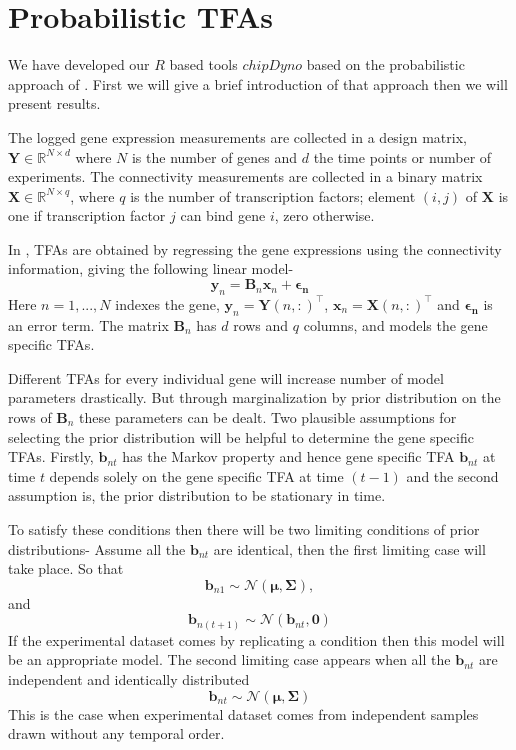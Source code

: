 \section{Probabilistic TFAs}
We have developed our $R$ based tools $chipDyno$ based on the probabilistic approach of \cite{Sanguinetti:2006}. First we will give a brief introduction of that approach then we will present results.

The logged gene expression measurements are collected in a design matrix, $\textbf{Y} \in \mathbb{R}^{ N \times d}$ where $N$ is the number of genes and $d$ the time points or number of experiments. 
The connectivity measurements are collected in a binary matrix $\textbf{X} \in \mathbb{R} ^ {N \times q}$, where $q$ is the number of transcription factors; element $(i, j)$ of $\textbf{X}$ is one 
if transcription factor $j$ can bind gene $i$, zero otherwise.

In \cite{Sanguinetti:2006}, TFAs are obtained by regressing the gene expressions using the connectivity information, giving the following linear model- 
\begin{equation} \label{eq:linear_model_TFA}
\textbf{y}_n = \textbf{B}_n \textbf{x}_n + \boldsymbol{\epsilon_{n}}
\end{equation}
Here $n = 1, . . . ,N$ indexes the gene, $\textbf{y}_n =\textbf{Y}(n,:)^{\top}$, $\textbf{x}_n=\textbf{X}(n,:)^{\top}$ and $\boldsymbol{\epsilon_{n}}$ is an error term. The matrix $\textbf{B}_n$ has $d$ rows and $q$ columns, and models the gene specific TFAs.

Different TFAs for every individual gene will increase number of model parameters drastically. But through marginalization by prior distribution on the rows of $\textbf{B}_n$ these parameters can be dealt. Two plausible assumptions for selecting the prior distribution will be helpful to determine the gene specific TFAs. Firstly, $\textbf{b}_{nt}$ has the Markov property and hence gene specific TFA $\textbf{b}_{nt} $ at time $t$ depends solely on the gene specific TFA at time $(t-1)$ and the second assumption is, the prior distribution to be stationary in time.

To satisfy these conditions then there will be two limiting conditions of prior distributions- Assume all the $\textbf{b}_{nt}$ are identical, then the first limiting case will take place. So that
\begin{equation} \label{eq:limit_one_a}
   \textbf{b}_{n1} \sim \mathcal{N} ( \boldsymbol{\mu},\boldsymbol{\Sigma}), 
\end{equation}
and
\begin{equation} \label{eq:limit_one_b}
   \textbf{b}_{n(t+1)} \sim \mathcal{N} ( \textbf{b}_{nt},\textbf{0})
\end{equation}
If the experimental dataset comes by replicating a condition then this model will be an appropriate model. The second limiting case appears when all the $\textbf{b}_{nt}$ are independent and identically distributed
\begin{equation} \label{eq:limit_two}
   \textbf{b}_{nt}\sim \mathcal{N} ( \boldsymbol{\mu},\boldsymbol{\Sigma})
\end{equation}
This is the case when experimental dataset comes from independent samples drawn without any temporal order.

